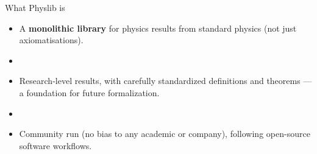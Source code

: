 \documentclass[aspectratio=169,10pt]{beamer}
\begin{document}
\begin{frame}{What Physlib is}
  \vfill
  \begin{center}
    \begin{minipage}{0.85\textwidth}
      \large
      \begin{itemize}
        \item A \textbf{monolithic library} for physics results from standard
          physics (not just axiomatisations).
        \item[] \vspace{4pt}
        \item Research-level results, with carefully standardized definitions
          and theorems --- a foundation for future formalization.
        \item[] \vspace{4pt}
        \item Community run (no bias to any academic or company), following
          open-source software workflows.
      \end{itemize}
    \end{minipage}
  \end{center}
  \vfill
\end{frame}
\end{document}
